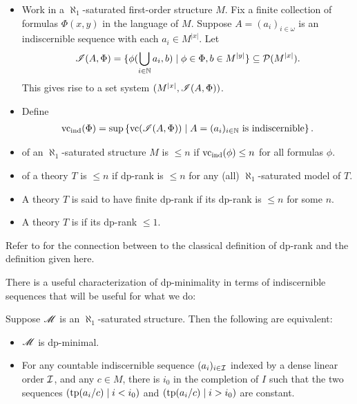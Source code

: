\begin{Definition} \label{def_dp}
  \begin{itemize}
  \item
    Work in a $\aleph_1$-saturated first-order structure $M$.
    Fix a finite collection of formulas $\Phi(x, y)$ in the language of $M$.
    Suppose $A = (a_i)_{i \in \omega}$ is an indiscernible sequence with each $a_i \in M^{|x|}$.
    Let
    \begin{align*}
      \mathscr I(A, \Phi) = \{\phi(\bigcup_{i \in \mathbb{N}} a_i, b) \mid \phi \in \Phi, b \in M^{|y|}\} \subseteq \mathcal P(M^{|x|}).     
    \end{align*}
    This gives rise to a set system $(M^{|x|}, \mathscr I(A, \Phi))$.
  \item Define
    \begin{align*}
      \operatorname{vc}_{\operatorname{ind}}(\Phi) = \sup \left\{\operatorname{vc}(\mathscr I(A, \Phi)) \mid A = (a_i)_{i \in \mathbb{N}} \text{ is indiscernible}\right\}.
    \end{align*}
  \item {} of an $\aleph_1$-saturated structure $M$ is $\leq n$ if $\operatorname{vc}_{\operatorname{ind}}(\phi) \leq n$ for all formulas $\phi$.
  \item {} of a theory $T$ is $\leq n$ if dp-rank is $\leq n$ for any (all) $\aleph_1$-saturated model of $T$.
  \item A theory $T$ is said to have finite dp-rank if its dp-rank is $\leq n$ for some $n$.
  \item A theory $T$ is  if its dp-rank $\leq 1$.
  \end{itemize}
\end{Definition}

Refer to \cite{guingona} for the connection between to the classical definition of dp-rank and the definition given here.

There is a useful characterization of dp-minimality in terms of indiscernible sequences that will be useful for what we do:
\begin{Lemma}  \label{dp_min_simon}
  Suppose $\mathscr M$ is an $\aleph_1$-saturated structure.
  Then the following are equivalent:
  \begin{itemize}
  \item $\mathscr M$ is dp-minimal.
  \item For any countable indiscernible sequence $(a_i)_{i \in \operatorname{\mathcal I}}$ indexed by a dense linear order $\operatorname{\mathcal I}$,
    and any $c \in M$, there is $i_0$ in the completion of $I$
    such that the two sequences $\left(\operatorname{tp}(a_i/c) \mid i < i_0\right)$ and
    $\left(\operatorname{tp}(a_i/c) \mid i > i_0\right)$ are constant.
  \end{itemize}
\end{Lemma}
